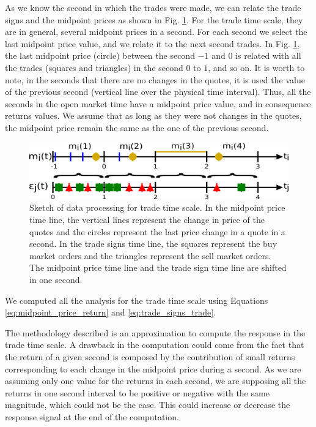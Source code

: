 As we know the second in which the trades were made, we can relate the trade
signs and the midpoint prices as shown in Fig.
\ref{fig:relation_trades_midpoint_trade_scale}. For the trade time scale, they
are in general, several midpoint prices in a second. For each second we
select the last midpoint price value, and we relate it to the next second
trades. In Fig. \ref{fig:relation_trades_midpoint_trade_scale}, the last
midpoint price (circle) between the second $-1$ and $0$ is related with all the
trades (squares and triangles) in the second $0$ to $1$, and so on. It is worth
to note, in the seconds that there are no changes in the quotes, it is used the
value of the previous second (vertical line over the physical time interval).
Thus, all the seconds in the open market time have a midpoint price value, and
in consequence returns values. We assume that as long as they were not changes
in the quotes, the midpoint price remain the same as the one of the previous
second.

\begin{figure}[htbp]
    \centering
    \includegraphics[width=\columnwidth]
    {figures/02_relation_trades_quotes_trade_scale.png}
    \caption{Sketch of data processing for trade time scale. In the midpoint
             price time line, the vertical lines represent the change in price
             of the quotes and the circles represent the last price change in a
             quote in a second. In the trade signs time line, the squares
             represent the buy market orders and the triangles represent the
             sell market orders. The midpoint price time line and the trade
             sign time line are shifted in one second.}
    \label{fig:relation_trades_midpoint_trade_scale}
\end{figure}

We computed all the analysis for the trade time scale using Equations
\ref{eq:midpoint_price_return} and \ref{eq:trade_signs_trade}.

The methodology described is an approximation to compute the response in the
trade time scale. A drawback in the computation could come from the fact that
the return of a given second is composed by the contribution of small returns
corresponding to each change in the midpoint price during a second. As we are
assuming only one value for the returns in each second, we are supposing  all
the returns in one second interval to be positive or negative with the same
magnitude, which could not be the case. This could increase or decrease the
response signal at the end of the computation.

